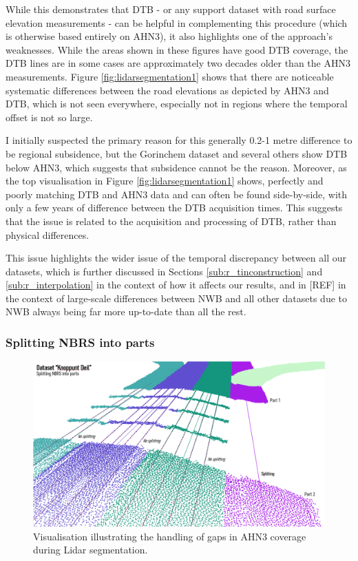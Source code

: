 While this demonstrates that DTB - or any support dataset with road surface elevation measurements - can be helpful in complementing this procedure (which is otherwise based entirely on AHN3), it also highlights one of the approach's weaknesses. While the areas shown in these figures have good DTB coverage, the DTB lines are in some cases are approximately two decades older than the AHN3 measurements. Figure \ref{fig:lidarsegmentation1} shows that there are noticeable systematic differences between the road elevations as depicted by AHN3 and DTB, which is not seen everywhere, especially not in regions where the temporal offset is not so large.

I initially suspected the primary reason for this generally 0.2-1 metre difference to be regional subsidence, but the Gorinchem dataset and several others show DTB below AHN3, which suggests that subsidence cannot be the reason. Moreover, as the top visualisation in Figure \ref{fig:lidarsegmentation1} shows, perfectly and poorly matching DTB and AHN3 data and can often be found side-by-side, with only a few years of difference between the DTB acquisition times. This suggests that the issue is related to the acquisition and processing of DTB, rather than physical differences.

This issue highlights the wider issue of the temporal discrepancy between all our datasets, which is further discussed in Sections \ref{sub:r_tinconstruction} and \ref{sub:r_interpolation} in the context of how it affects our results, and in [REF] in the context of large-scale differences between NWB and all other datasets due to NWB always being far more up-to-date than all the rest.

\subsubsection{Splitting NBRS into parts}

\begin{figure}[]
    \centering
    \includegraphics[width=0.9\linewidth]{final_report/figs/lidarsegmentation2.png}
    \caption{Visualisation illustrating the handling of gaps in AHN3 coverage during Lidar segmentation.}
    \label{fig:lidarsegmentation2}
\end{figure}

